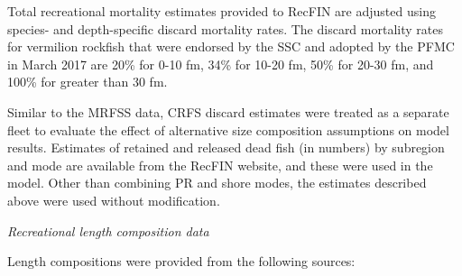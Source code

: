 \documentclass[11pt,
  english,
]{article}
\begin{document}
Total recreational mortality estimates provided to RecFIN are adjusted using species- and depth-specific discard mortality rates. The discard mortality rates for vermilion rockfish that were endorsed by the SSC and adopted by the PFMC in March 2017 are 20\% for 0-10 fm, 34\% for 10-20 fm, 50\% for 20-30 fm, and 100\% for greater than 30 fm.

Similar to the MRFSS data, CRFS discard estimates were treated as a separate fleet to evaluate the effect of alternative size composition assumptions on model results. Estimates of retained and released dead fish (in numbers) by subregion and mode are available from the RecFIN website, and these were used in the model. Other than combining PR and shore modes, the estimates described above were used without modification.

\emph{Recreational length composition data}

Length compositions were provided from the following sources:

\end{document}
